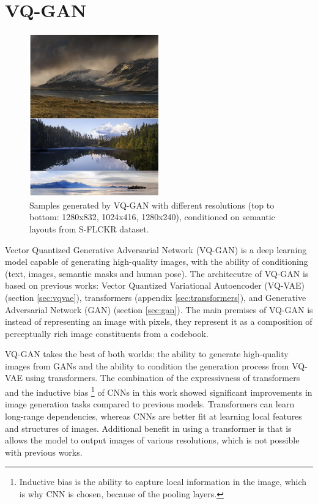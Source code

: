 \section{VQ-GAN}
\label{sec:vqgan}

\begin{figure}
    \centering
    \includegraphics[width=0.5\textwidth]{images/vqgan_samples.png}
    \caption{Samples generated by VQ-GAN with different resolutions (top to bottom: 1280x832, 1024x416, 1280x240), conditioned on semantic layouts from S-FLCKR dataset.}
\end{figure}

Vector Quantized Generative Adversarial Network (VQ-GAN) \cite{vqgan} is a deep learning model capable of generating high-quality images, with the ability of conditioning (text, images, semantic masks and human pose). The architecutre of VQ-GAN is based on previous works: Vector Quantized Variational Autoencoder (VQ-VAE) \cite{vqvae} (section \ref{sec:vqvae}), transformers \cite{transformer} (appendix \ref{sec:transformers}), and Generative Adversarial Network (GAN) \cite{gan} (section \ref{sec:gan}). The main premises of VQ-GAN is instead of representing an image with pixels, they represent it as a composition of perceptually rich image constituents from a codebook.

VQ-GAN takes the best of both worlds: the ability to generate high-quality images from GANs and the ability to condition the generation process from VQ-VAE using transformers. The combination of the expressivness of transformers and the inductive bias \footnote[1]{Inductive bias is the ability to capture local information in the image, which is why CNN is chosen,  because of the pooling layers.} of CNNs \cite{cnn} in this work showed significant improvements in image generation tasks compared to previous models. Transformers can learn long-range dependencies, whereas CNNs are better fit at learning local features and structures of images. Additional benefit in using a transformer is that is allows the model to output images of various resolutions, which is not possible with previous works.

